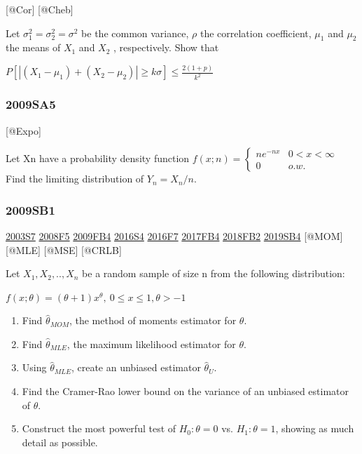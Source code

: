 \documentclass[6pt,twocolumn,Portrait]{article}
\begin{document}
{[}@Cor{]} {[}@Cheb{]}

Let \(\sigma_1^2=\sigma_2^2=\sigma^2\) be the common variance, \(\rho\)
the correlation coefficient, \(\mu_1\) and \(\mu_2\) the means of
\(X_1\) and \(X_2\) , respectively. Show that

\(P[|(X_1-\mu_1)+(X_2-\mu_2)|\ge k\sigma]\le\frac{2(1+p)}{k^2}\)

\hypertarget{sa5}{%
\subsubsection{2009SA5}\label{sa5}}

{[}@Expo{]}

Let Xn have a probability density function
\(f(x;n)=\begin{cases}ne^{-nx}& 0<x<\infty\\0& o.w.\end{cases}\) Find
the limiting distribution of \(Y_n=X_n/n\).

\hypertarget{sb1}{%
\subsubsection{2009SB1}\label{sb1}}

\protect\hyperlink{s7}{2003S7} \protect\hyperlink{f5-3}{2008F5}
\protect\hyperlink{fb4}{2009FB4} \protect\hyperlink{s4-4}{2016S4}
\protect\hyperlink{f7-5}{2016F7} \protect\hyperlink{fb4-3}{2017FB4}
\protect\hyperlink{fb2-4}{2018FB2} \protect\hyperlink{sb4-2}{2019SB4}
{[}@MOM{]} {[}@MLE{]} {[}@MSE{]} {[}@CRLB{]}

Let \(X_1,X_2,..,X_n\) be a random sample of size n from the following
distribution:

\(f(x;\theta)=(\theta+1)x^\theta,\ 0\le x\le 1,\theta>-1\)

\begin{enumerate}
\def\labelenumi{(\alph{enumi})}
\item
  Find \(\hat\theta_{MOM}\), the method of moments estimator for
  \(\theta\).
\item
  Find \(\hat\theta_{MLE}\), the maximum likelihood estimator for
  \(\theta\).
\item
  Using \(\hat\theta_{MLE}\), create an unbiased estimator
  \(\hat\theta_{U}\).
\item
  Find the Cramer-Rao lower bound on the variance of an unbiased
  estimator of \(\theta\).
\item
  Construct the most powerful test of \(H_0:\theta=0\) vs.
  \(H_1:\theta=1\), showing as much detail as possible.
\end{enumerate}
\end{document}
